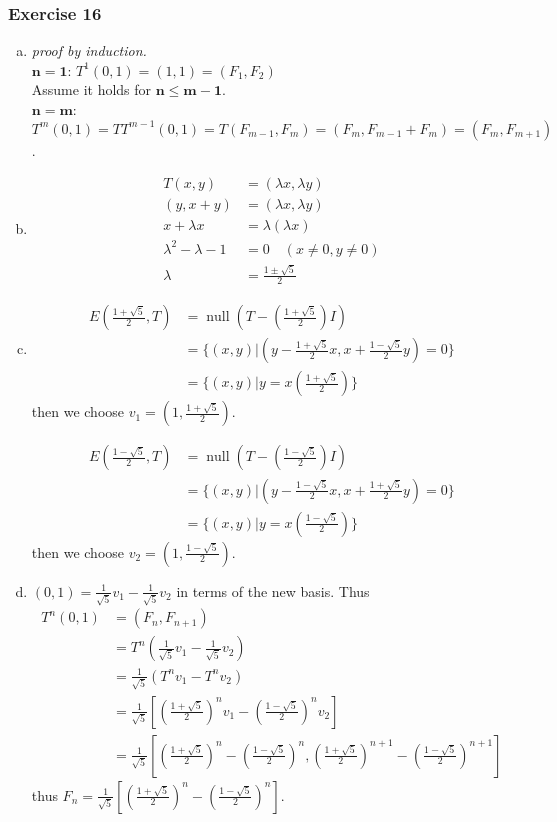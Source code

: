 \documentclass[12pt, letterpaper]{scrartcl}
\DeclareMathOperator{\Null}{null}
\begin{document}
\subsubsection*{Exercise 16}
\begin{enumerate}[(a)]
    \item \emph{proof by induction.}\\
    $\mathbf{n=1}$: $T^1(0,1)=(1,1)=(F_1,F_2)$\\
    Assume it holds for $\mathbf{n\leq m-1}$.\\
    $\mathbf{n=m}$: $T^{m}(0,1)=TT^{m-1}(0,1)=T(F_{m-1},F_{m})=(F_{m},F_{m-1}+F_{m})=(F_{m},F_{m+1})$.

    \item 
    \begin{align*}
        T(x,y)&=(\lambda x,\lambda y)\\
        (y,x+y)&=(\lambda x,\lambda y)\\
        x+\lambda x &= \lambda (\lambda x)\\
        \lambda^2-\lambda-1&=0 \quad (x\neq0, y\neq0)\\
        \lambda&=\frac{1\pm\sqrt{5}}{2}
    \end{align*}

    \item 
    \begin{align*}
        E(\frac{1+\sqrt{5}}{2},T)&=\Null(T-(\frac{1+\sqrt{5}}{2}) I)\\
        &=\{(x,y)|(y-\frac{1+\sqrt{5}}{2}x, x+\frac{1-\sqrt{5}}{2}y )=0\}\\
        &=\{(x,y)|y=x(\frac{1+\sqrt{5}}{2})\}
    \end{align*}
    then we choose $v_1=(1, \frac{1+\sqrt{5}}{2})$.

    \begin{align*}
        E(\frac{1-\sqrt{5}}{2},T)&=\Null(T-(\frac{1-\sqrt{5}}{2}) I)\\
        &=\{(x,y)|(y-\frac{1-\sqrt{5}}{2}x, x+\frac{1+\sqrt{5}}{2}y )=0\}\\
        &=\{(x,y)|y=x(\frac{1-\sqrt{5}}{2})\}
    \end{align*}
    then we choose $v_2=(1, \frac{1-\sqrt{5}}{2})$.

    \item $(0,1)=\frac{1}{\sqrt{5}}v_1-\frac{1}{\sqrt{5}}v_2$ in terms of the new basis. Thus
    \begin{align*}
    T^n(0,1)&=(F_n,F_{n+1})\\
    &=T^n(\frac{1}{\sqrt{5}}v_1-\frac{1}{\sqrt{5}}v_2)\\
    &=\frac{1}{\sqrt{5}}(T^nv_1-T^nv_2)\\
    &=\frac{1}{\sqrt{5}}\left[\left(\frac{1+\sqrt{5}}{2}\right)^nv_1-\left(\frac{1-\sqrt{5}}{2}\right)^nv_2\right]\\
    &=\frac{1}{\sqrt{5}}\left[\left(\frac{1+\sqrt{5}}{2}\right)^n-\left(\frac{1-\sqrt{5}}{2}\right)^n, \left(\frac{1+\sqrt{5}}{2}\right)^{n+1}-\left(\frac{1-\sqrt{5}}{2}\right)^{n+1}\right]
    \end{align*}
    thus $F_n=\frac{1}{\sqrt{5}}\left[\left(\frac{1+\sqrt{5}}{2}\right)^n-\left(\frac{1-\sqrt{5}}{2}\right)^n\right]$.


\end{enumerate}
\end{document}
